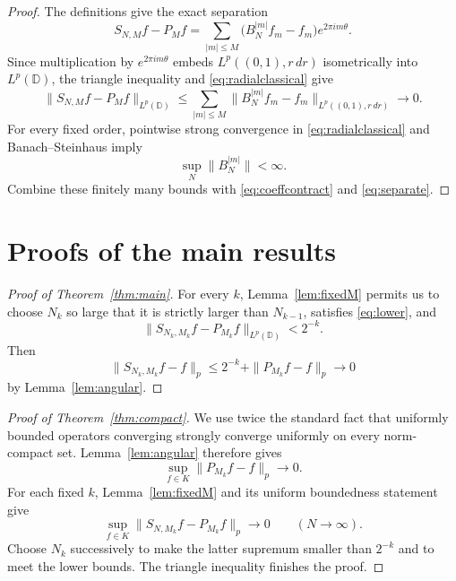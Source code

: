\documentclass[11pt]{article}
\newcommand{\D}{\mathbb D}
\begin{document}
\begin{proof}
The definitions give the exact separation
\begin{equation}\label{eq:separate}
 S_{N,M}f-P_Mf
 =\sum_{|m|\le M}
   \bigl(B_N^{|m|}f_m-f_m\bigr)e^{2\pi i m\theta}.
\end{equation}
Since multiplication by $e^{2\pi i m\theta}$ embeds
$L^p((0,1),r\,dr)$ isometrically into $L^p(\D)$, the triangle inequality
and \eqref{eq:radialclassical} give
\begin{equation}\label{eq:finitesum}
 \|S_{N,M}f-P_Mf\|_{L^p(\D)}
 \le \sum_{|m|\le M}
 \|B_N^{|m|}f_m-f_m\|_{L^p((0,1),r\,dr)}\longrightarrow0.
\end{equation}
For every fixed order, pointwise strong convergence in
\eqref{eq:radialclassical} and Banach--Steinhaus imply
\[
 \sup_N\|B_N^{|m|}\|<\infty.
\]
Combine these finitely many bounds with
\eqref{eq:coeffcontract} and \eqref{eq:separate}.
\end{proof}

\section{Proofs of the main results}

\begin{proof}[Proof of Theorem~\ref{thm:main}]
For every $k$, Lemma~\ref{lem:fixedM} permits us to choose $N_k$ so large
that it is strictly larger than $N_{k-1}$, satisfies \eqref{eq:lower}, and
\begin{equation}\label{eq:diagerror}
 \|S_{N_k,M_k}f-P_{M_k}f\|_{L^p(\D)}<2^{-k}.
\end{equation}
Then
\[
 \|S_{N_k,M_k}f-f\|_p
 \le 2^{-k}+\|P_{M_k}f-f\|_p\longrightarrow0
\]
by Lemma~\ref{lem:angular}.
\end{proof}

\begin{proof}[Proof of Theorem~\ref{thm:compact}]
We use twice the standard fact that uniformly bounded operators converging
strongly converge uniformly on every norm-compact set.  Lemma~\ref{lem:angular}
therefore gives
\[
 \sup_{f\in K}\|P_{M_k}f-f\|_p\longrightarrow0.
\]
For each fixed $k$, Lemma~\ref{lem:fixedM} and its uniform boundedness
statement give
\[
 \sup_{f\in K}\|S_{N,M_k}f-P_{M_k}f\|_p\longrightarrow0
 \qquad(N\to\infty).
\]
Choose $N_k$ successively to make the latter supremum smaller than $2^{-k}$
and to meet the lower bounds.  The triangle inequality finishes the proof.
\end{proof}
\end{document}
